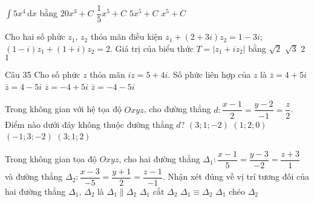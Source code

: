 \begin{ex}%
$\displaystyle\int\limits 5x^4 \mathrm{\,d}x$ bằng
\choice
{$20x^3+C$}
{$\dfrac{1}{5}x^5+C$}
{$5x^5+C$}
{\True $x^5+C$}
\end{ex}

\begin{ex}%
Cho hai số phức $z_1$, $z_2$ thỏa mãn điều kiện $z_1+(2+3i)z_2=1-3i$; $(1-i)z_1+(1+i)z_2=2$. Giá trị của biểu thức $T=\left|z_1+iz_2\right|$ bằng
\choice
{$\sqrt{2}$}
{$\sqrt{3}$}
{\True $2$}
{$1$}
\end{ex}

\begin{ex}Câu 35%
Cho số phức $z$ thỏa mãn $iz=5+4i$. Số phức liên hợp của $z$ là
\choice
{\True $\overline{z}=4+5i$}
{$\overline{z}=4-5i$}
{$\overline{z}=-4+5i$}
{$\overline{z}=-4-5i$}
\end{ex}

\begin{ex}%
Trong không gian với hệ tọa độ $Oxyz$, cho đường thẳng $d\colon \dfrac{x-1}{2}=\dfrac{y-2}{-1}=\dfrac{z}{2}$. Điểm nào dưới đây không thuộc đường thẳng $d$?
\choice
{\True $\left(3;1;-2\right)$}
{$\left(1;2;0\right)$}
{$\left(-1;3;-2\right)$}
{$\left(3;1;2\right)$}
\end{ex}

\begin{ex}%
Trong không gian tọa độ $Oxyz$, cho hai đường thẳng $\Delta_1\colon \dfrac{x-1}{5}=\dfrac{y-3}{-2}=\dfrac{z+3}{1}$ và đường thẳng $\Delta_2\colon \dfrac{x-3}{-5}=\dfrac{y+1}{2}=\dfrac{z-1}{-1}$. Nhận xét đúng về vị trí tương đối của hai đường thẳng $\Delta_1$, $\Delta_2$ là
\choice
{\True $\Delta_1\parallel\Delta_2$}
{$\Delta_1$ cắt $\Delta_2$}
{$\Delta_1\equiv\Delta_2$}
{$\Delta_1$ chéo $\Delta_2$}
\end{ex}

